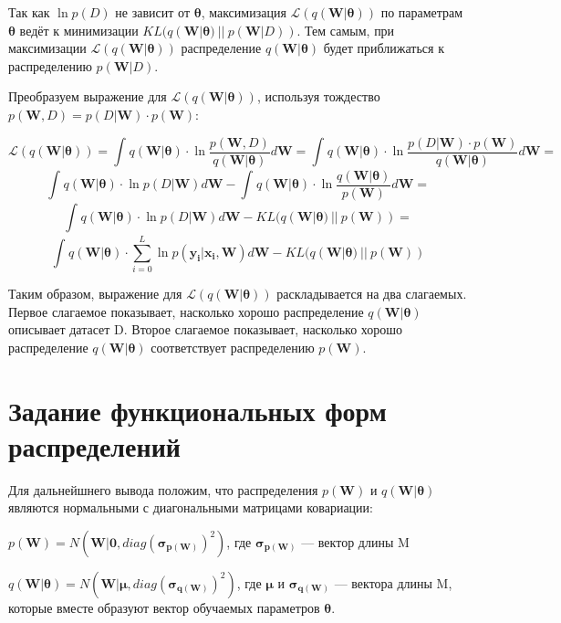 \documentclass{article}
\begin{document}
Так как $\ln{p(D)}$ не зависит от $\pmb{\theta}$, максимизация $\mathcal{L}(q(\pmb{W} | \pmb{\theta}))$ по параметрам $\pmb{\theta}$ ведёт к минимизации $KL(q(\pmb{W} | \pmb{\theta})~||~p(\pmb{W}| D))$. Тем самым, при максимизации $\mathcal{L}(q(\pmb{W} | \pmb{\theta}))$ распределение $q(\pmb{W} | \pmb{\theta})$ будет приближаться к распределению $p(\pmb{W}| D)$.

Преобразуем выражение для $\mathcal{L}(q(\pmb{W} | \pmb{\theta}))$, используя тождество $p(\pmb{W}, D) = p(D | \pmb{W}) \cdot p(\pmb{W})$:

\[
\mathcal{L}(q(\pmb{W} | \pmb{\theta})) =
\int_{}{} q(\pmb{W} | \pmb{\theta}) \cdot \ln{\dfrac{p(\pmb{W}, D)}{q(\pmb{W} | \pmb{\theta})}} d \pmb{W} =
\int_{}{} q(\pmb{W} | \pmb{\theta}) \cdot \ln{\dfrac{p(D | \pmb{W}) \cdot p(\pmb{W})}{q(\pmb{W} | \pmb{\theta})}} d \pmb{W} =
\]\[
\int_{}{} q(\pmb{W} | \pmb{\theta}) \cdot \ln{p(D | \pmb{W})} d \pmb{W} - \int_{}{} q(\pmb{W} | \pmb{\theta}) \cdot \ln{\dfrac{q(\pmb{W} | \pmb{\theta})}{p(\pmb{W})}} d \pmb{W} =
\]\[
\int_{}{} q(\pmb{W} | \pmb{\theta}) \cdot \ln{p(D | \pmb{W})} d \pmb{W} - KL(q(\pmb{W} | \pmb{\theta})~||~p(\pmb{W})) =
\]\[
\int_{}{} q(\pmb{W} | \pmb{\theta}) \cdot \sum_{i=0}^{L} {\ln{p(\pmb{y_{i}} | \pmb{x_{i}}, \pmb{W})}} d \pmb{W} - KL(q(\pmb{W} | \pmb{\theta})~||~p(\pmb{W}))
\]

Таким образом, выражение для $\mathcal{L}(q(\pmb{W} | \pmb{\theta}))$ раскладывается на два слагаемых. Первое слагаемое показывает, насколько хорошо распределение $q(\pmb{W} | \pmb{\theta})$ описывает датасет D. Второе слагаемое показывает, насколько хорошо распределение $q(\pmb{W} | \pmb{\theta})$ соответствует распределению $p(\pmb{W})$.

\section{Задание функциональных форм распределений}
Для дальнейшнего вывода положим, что распределения $p(\pmb{W})$ и $q(\pmb{W} | \pmb{\theta})$ являются нормальными с диагональными матрицами ковариации:

$
p(\pmb{W}) =
N(\pmb{W} | \pmb{0}, diag(\pmb{\sigma_{p(\pmb{W})}})^{2})$,
где $\pmb{\sigma_{p(\pmb{W})}}$ — вектор длины M

$q(\pmb{W} | \pmb{\theta}) = N(\pmb{W} | \pmb{\mu}, diag(\pmb{\sigma_{q(\pmb{W})}})^{2})$, где $\pmb{\mu}$ и $\pmb{\sigma_{q(\pmb{W})}}$ — вектора длины M, которые вместе образуют вектор обучаемых параметров $\pmb{\theta}$.
\end{document}
